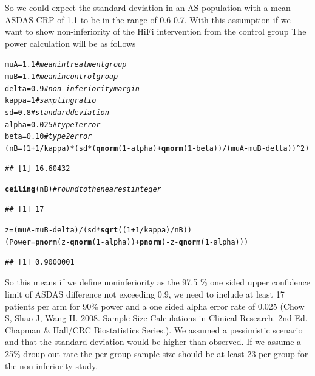 \documentclass{article}\usepackage[]{graphicx}\usepackage[]{color}
\makeatletter
\newcommand{\hlnum}[1]{\textcolor[rgb]{0.686,0.059,0.569}{#1}}%
\newcommand{\hlcom}[1]{\textcolor[rgb]{0.678,0.584,0.686}{\textit{#1}}}%
\newcommand{\hlopt}[1]{\textcolor[rgb]{0,0,0}{#1}}%
\newcommand{\hlstd}[1]{\textcolor[rgb]{0.345,0.345,0.345}{#1}}%
\newcommand{\hlkwb}[1]{\textcolor[rgb]{0.69,0.353,0.396}{#1}}%
\newcommand{\hlkwd}[1]{\textcolor[rgb]{0.737,0.353,0.396}{\textbf{#1}}}%
\newenvironment{kframe}{%
 \def\at@end@of@kframe{}%
 \ifinner\ifhmode%
  \def\at@end@of@kframe{\end{minipage}}%
  \begin{minipage}{\columnwidth}%
 \fi\fi%
 \def\FrameCommand##1{\hskip\@totalleftmargin \hskip-\fboxsep
 \colorbox{shadecolor}{##1}\hskip-\fboxsep
     \hskip-\linewidth \hskip-\@totalleftmargin \hskip\columnwidth}%
 \MakeFramed {\advance\hsize-\width
   \@totalleftmargin\z@ \linewidth\hsize
   \@setminipage}}%
 {\par\unskip\endMakeFramed%
 \at@end@of@kframe}
\newenvironment{knitrout}{}{} %
\makeatother
\begin{document}
So we could expect the standard deviation in an AS population with a mean ASDAS-CRP of 1.1 to be in the range of 0.6-0.7.
With this assumption if we want to show non-inferiority of the HiFi intervention from the control group The power calculation will be as follows
\begin{knitrout}
\color{fgcolor}\begin{kframe}
\begin{alltt}
\hlstd{muA}\hlkwb{=}\hlnum{1.1} \hlcom{#mean in treatment group}
\hlstd{muB}\hlkwb{=}\hlnum{1.1} \hlcom{#mean in control group}
\hlstd{delta}\hlkwb{=}\hlnum{0.9} \hlcom{#non-inferiority margin}
\hlstd{kappa}\hlkwb{=}\hlnum{1} \hlcom{#sampling ratio}
\hlstd{sd}\hlkwb{=}\hlnum{0.8} \hlcom{#standard deviation}
\hlstd{alpha}\hlkwb{=}\hlnum{0.025} \hlcom{#type 1 error}
\hlstd{beta}\hlkwb{=}\hlnum{0.10} \hlcom{#type2 error}
\hlstd{(nB}\hlkwb{=}\hlstd{(}\hlnum{1}\hlopt{+}\hlnum{1}\hlopt{/}\hlstd{kappa)}\hlopt{*}\hlstd{(sd}\hlopt{*}\hlstd{(}\hlkwd{qnorm}\hlstd{(}\hlnum{1}\hlopt{-}\hlstd{alpha)}\hlopt{+}\hlkwd{qnorm}\hlstd{(}\hlnum{1}\hlopt{-}\hlstd{beta))}\hlopt{/}\hlstd{(muA}\hlopt{-}\hlstd{muB}\hlopt{-}\hlstd{delta))}\hlopt{^}\hlnum{2}\hlstd{)}
\end{alltt}
\begin{verbatim}
## [1] 16.60432
\end{verbatim}
\begin{alltt}
\hlkwd{ceiling}\hlstd{(nB)} \hlcom{# round to the nearest integer}
\end{alltt}
\begin{verbatim}
## [1] 17
\end{verbatim}
\begin{alltt}
\hlstd{z}\hlkwb{=}\hlstd{(muA}\hlopt{-}\hlstd{muB}\hlopt{-}\hlstd{delta)}\hlopt{/}\hlstd{(sd}\hlopt{*}\hlkwd{sqrt}\hlstd{((}\hlnum{1}\hlopt{+}\hlnum{1}\hlopt{/}\hlstd{kappa)}\hlopt{/}\hlstd{nB))}
\hlstd{(Power}\hlkwb{=}\hlkwd{pnorm}\hlstd{(z}\hlopt{-}\hlkwd{qnorm}\hlstd{(}\hlnum{1}\hlopt{-}\hlstd{alpha))}\hlopt{+}\hlkwd{pnorm}\hlstd{(}\hlopt{-}\hlstd{z}\hlopt{-}\hlkwd{qnorm}\hlstd{(}\hlnum{1}\hlopt{-}\hlstd{alpha)))}
\end{alltt}
\begin{verbatim}
## [1] 0.9000001
\end{verbatim}
\end{kframe}
\end{knitrout}

So this means if we define noninferiority as the 97.5 \% one sided upper confidence limit of ASDAS difference not exceeding 0.9, we need to include at least 17 patients per arm for 90\% power and a one sided alpha error rate of 0.025 (Chow S, Shao J, Wang H. 2008. Sample Size Calculations in Clinical Research. 2nd Ed. Chapman & Hall/CRC Biostatistics Series.). We assumed a pessimistic scenario and that the standard deviation would be higher than observed. If we assume a 25\% droup out rate the per group sample size should be at least 23 per group for the non-inferiority study.
\end{document}

